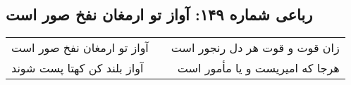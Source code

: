 \begin{center}
\section*{رباعی شماره ۱۴۹: آواز تو ارمغان نفخ صور است}
\label{sec:0149}
\begin{longtable}{l p{0.5cm} r}
آواز تو ارمغان نفخ صور است
&&
زان قوت و قوت هر دل رنجور است
\\
آواز بلند کن کهتا پست شوند
&&
هرجا که امیریست و یا مأمور است
\\
\end{longtable}
\end{center}
